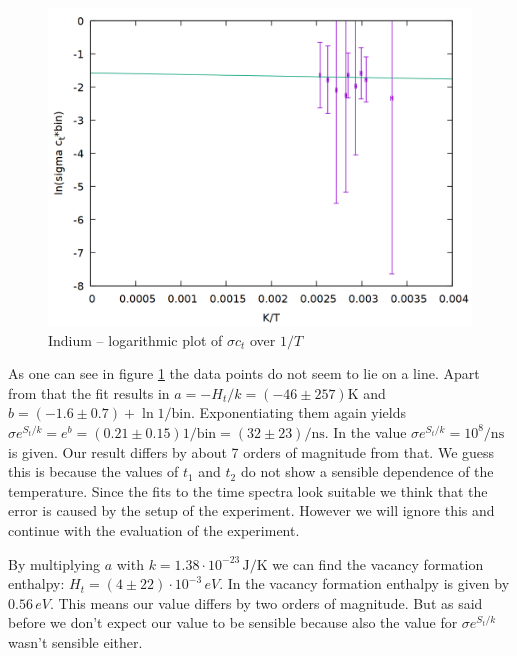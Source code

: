 \begin{figure}
\centering
\includegraphics[width=0.7\linewidth]{auswertung/fit.png}
\caption{Indium -- logarithmic plot of $\sigma c_t$ over $1/T$}
\label{fig:indium_res}
\end{figure}

As one can see in figure \ref{fig:indium_res} the data points do not seem to lie on a line. Apart from that the fit results in $a = -H_t/k = (-46 \pm 257) \si{\kelvin}$ and $b = (-1.6 \pm 0.7) + \ln{1/\mathrm{bin}}$. Exponentiating them again yields $\sigma e^{S_t/k} = e^b = (0.21 \pm 0.15) 1/\mathrm{bin} = (32 \pm 23) /\si{\nano\second}$. In \cite{weiler} the value $\sigma e^{S_t/k} = 10^8/\si{\nano\second}$ is given. Our result differs by about 7 orders of magnitude from that. We guess this is because the values of $t_1$ and $t_2$ do not show a sensible dependence of the temperature. Since the fits to the time spectra look suitable we think that the error is caused by the setup of the experiment. However we will ignore this and continue with the evaluation of the experiment.

By multiplying $a$ with $k = 1.38 \cdot 10^{-23}\,\si{\joule/\kelvin}$ \cite{boltzmann} we can find the vacancy formation enthalpy: $H_t = (4 \pm 22) \cdot 10^{-3}\,\si{eV}$. In \cite{enthalpy} the vacancy formation enthalpy is given by $0.56\,\si{eV}$. This means our value differs by two orders of magnitude. But as said before we don't expect our value to be sensible because also the value for $\sigma e^{S_t/k}$ wasn't sensible either. 